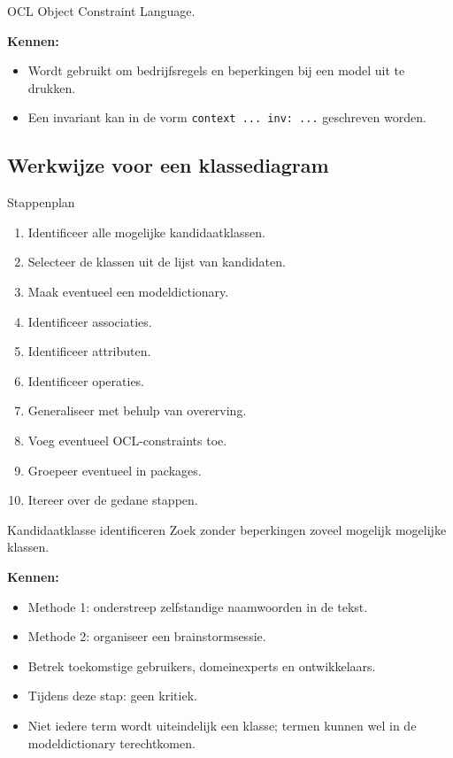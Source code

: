 \documentclass[11pt,a4paper]{article}
\begin{document}
\begin{definition}{OCL}
Object Constraint Language.

\textbf{Kennen:}
\begin{itemize}
    \item Wordt gebruikt om bedrijfsregels en beperkingen bij een model uit te drukken.
    \item Een invariant kan in de vorm \texttt{context ... inv: ...} geschreven worden.
\end{itemize}
\end{definition}

\subsection{Werkwijze voor een klassediagram}

\begin{studylist}{Stappenplan}
\begin{enumerate}
    \item Identificeer alle mogelijke kandidaatklassen.
    \item Selecteer de klassen uit de lijst van kandidaten.
    \item Maak eventueel een modeldictionary.
    \item Identificeer associaties.
    \item Identificeer attributen.
    \item Identificeer operaties.
    \item Generaliseer met behulp van overerving.
    \item Voeg eventueel OCL-constraints toe.
    \item Groepeer eventueel in packages.
    \item Itereer over de gedane stappen.
\end{enumerate}
\end{studylist}

\begin{definition}{Kandidaatklasse identificeren}
Zoek zonder beperkingen zoveel mogelijk mogelijke klassen.

\textbf{Kennen:}
\begin{itemize}
    \item Methode 1: onderstreep zelfstandige naamwoorden in de tekst.
    \item Methode 2: organiseer een brainstormsessie.
    \item Betrek toekomstige gebruikers, domeinexperts en ontwikkelaars.
    \item Tijdens deze stap: geen kritiek.
    \item Niet iedere term wordt uiteindelijk een klasse; termen kunnen wel in de modeldictionary terechtkomen.
\end{itemize}
\end{definition}
\end{document}
